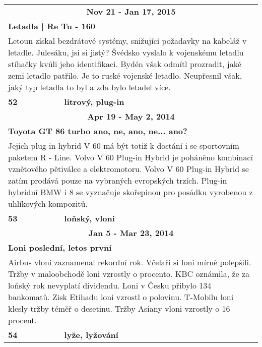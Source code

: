 \begin{tabularx}{\linewidth}{l l}
                \multicolumn{2}{c}{\bf Nov 21 - Jan 17, 2015} \\
                \multicolumn{2}{p{\linewidth}}{\bf Letadla | Re Tu - 160} \\
                \multicolumn{2}{p{\linewidth}}{Letoun získal bezdrátové systémy, snižující požadavky na kabeláž v letadle. Julesáku, jsi si jistý? Švédsko vyslalo k vojenskému letadlu stíhačky kvůli jeho identifikaci. Bydén však odmítl prozradit, jaké zemi letadlo patřilo.  Je to ruské vojenské letadlo. Neupřesnil však, jaký typ letadla to byl a zda bylo letadel více.} \\ \midrule
                [1.5pt]

            \bf 52 & \bf litrový, plug-in \\ \midrule
            
                \multicolumn{2}{c}{\bf Apr 19 - May 2, 2014} \\
                \multicolumn{2}{p{\linewidth}}{\bf Toyota GT 86 turbo ano, ne, ano, ne... ano?} \\
                \multicolumn{2}{p{\linewidth}}{Jejich plug-in hybrid V 60 má být totiž k dostání i se sportovním paketem R - Line. Volvo V 60 Plug-in Hybrid je poháněno kombinací vznětového pětiválce a elektromotoru. Volvo V 60 Plug-in Hybrid se zatím prodává pouze na vybraných evropských trzích. Plug-in hybridní BMW i 8 se vyznačuje skořepinou pro posádku vyrobenou z uhlíkových kompozitů.} \\ \midrule
                [1.5pt]

            \bf 53 & \bf loňský, vloni \\ \midrule
            
                \multicolumn{2}{c}{\bf Jan 5 - Mar 23, 2014} \\
                \multicolumn{2}{p{\linewidth}}{\bf Loni poslední, letos první} \\
                \multicolumn{2}{p{\linewidth}}{Airbus vloni zaznamenal rekordní rok. Včelaři si loni mírně polepšili. Tržby v maloobchodě loni vzrostly o procento. KBC oznámila, že za loňský rok nevyplatí dividendu. Loni v Česku přibylo 134 bankomatů. Zisk Etihadu loni vzrostl o polovinu. T-Mobilu loni klesly tržby téměř o desetinu. Tržby Asiany vloni vzrostly o 16 procent.} \\ \midrule
                [1.5pt]

            \bf 54 & \bf lyže, lyžování \\ \midrule
            

\end{tabularx}
